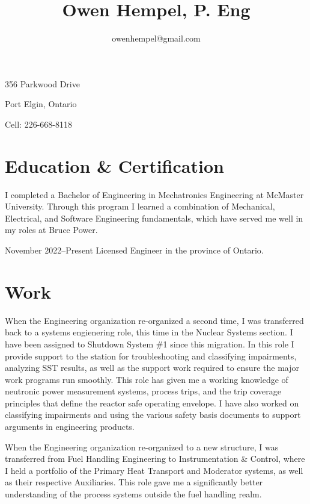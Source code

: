 \documentclass{my_cv}
\title{\bfseries\Huge Owen Hempel, P. Eng}
\author{owenhempel@gmail.com}
\date{}
\begin{document}
\maketitle

\vspace{1em}
\begin{minipage}[ht]{0.48\textwidth}
356 Parkwood Drive

Port Elgin, Ontario
\end{minipage}
\begin{minipage}[ht]{0.48\textwidth}
Cell: 226-668-8118
\end{minipage}


\section{Education \& Certification}
I completed a Bachelor of Engineering in Mechatronics Engineering at McMaster University. Through this program I learned a combination of Mechanical, Electrical, and Software Engineering fundamentals, which have served me well in my roles at Bruce Power.

 {November 2022--Present}
Licensed Engineer in the province of Ontario.

\section{Work}
When the Engineering organization re-organized a second time, I was transferred back to a systems engienering role, this time in the Nuclear Systems section. I have been assigned to Shutdown System \#1 since this migration. In this role I provide support to the station for troubleshooting and classifying impairments, analyzing SST results, as well as the support work required to ensure the major work programs run smoothly. This role has given me a working knowledge of neutronic power measurement systems, process trips, and the trip coverage principles that define the reactor safe operating envelope. I have also worked on classifying impairments and using the various safety basis documents to support arguments in engineering products. 


When the Engineering organization re-organized to a new structure, I was transferred from Fuel Handling Engineering to Instrumentation \& Control, where I held a portfolio of the Primary Heat Transport and Moderator systems, as well as their respective Auxiliaries. This role gave me a significantly better understanding of the process systems outside the fuel handling realm. 
\end{document}
